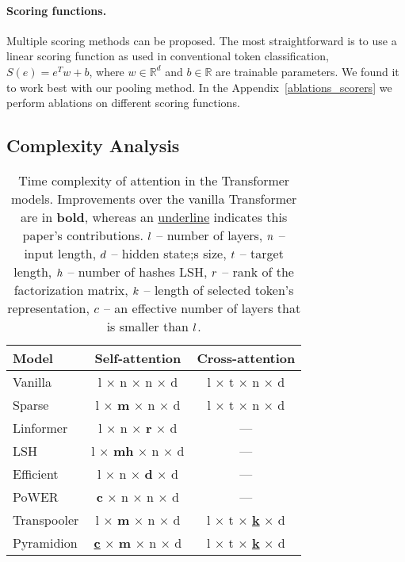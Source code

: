 \documentclass{article}
\begin{document}
\paragraph{Scoring functions.\label{sec:scoring}} 
Multiple scoring methods can be proposed. The most straightforward is to use a linear scoring function as used in conventional token classification, $S(e)=e^T w+b$, where $w\in \mathbb{R}^{d}$ and $b\in\mathbb{R}$ are trainable parameters. We found it to work best with our pooling method. In the Appendix~\ref{ablations_scorers} we perform ablations on different scoring functions.



\subsection{Complexity Analysis}

\begin{table}
    \centering
    \caption{
        Time complexity of attention in the Transformer models. Improvements over the vanilla Transformer are in \textbf{bold}, whereas an \underline{underline} indicates this paper's contributions.
        $\mathnormal{l}$ -- number of layers, $\mathnormal{n}$ -- input length, $\mathnormal{d}$ -- hidden state;s size, $\mathnormal{t}$ -- target length, $\mathnormal{h}$ -- number of hashes LSH, $\mathnormal{r}$ -- rank of the factorization matrix, $\mathnormal{k}$ -- length of selected token's representation, $\mathnormal{c}$ -- an effective number of layers that is smaller than $\mathnormal{l}$.
        }
        \label{complexity}
        \centering
        \begin{tabular}{lcc}
        \toprule
        Model & Self-attention & Cross-attention \\ \midrule
        Vanilla  & l $\times$ n $\times$ n $\times$ d & l $\times$ t $\times$ n $\times$ d \\     Sparse& l $\times$ \textbf{m} $\times$ n $\times$ d & l $\times$ t $\times$ n $\times$ d \\
        Linformer  & l $\times$ n $\times$ \textbf{r} $\times$ d & --- \\
LSH & l $\times$ \textbf{mh} $\times$ n $\times$ d &  --- \\
        Efficient & l $\times$ n $\times$ \textbf{d} $\times$ d & --- \\
        PoWER & \textbf{c} $\times$ n $\times$ n $\times$ d  & --- \\
        \midrule
        Transpooler & l $\times$ \textbf{m}  $\times$ n $\times$ d 
            & l $\times$ t $\times$ \textbf{\underline{k}} $\times$ d \\
        Pyramidion & \textbf{\underline{c}} $\times$ \textbf{m} $\times$ n $\times$ d 
            & l $\times$ t $\times$ \textbf{\underline{k}} $\times$ d \\
         \bottomrule
         \end{tabular}
\end{table}
\end{document}
